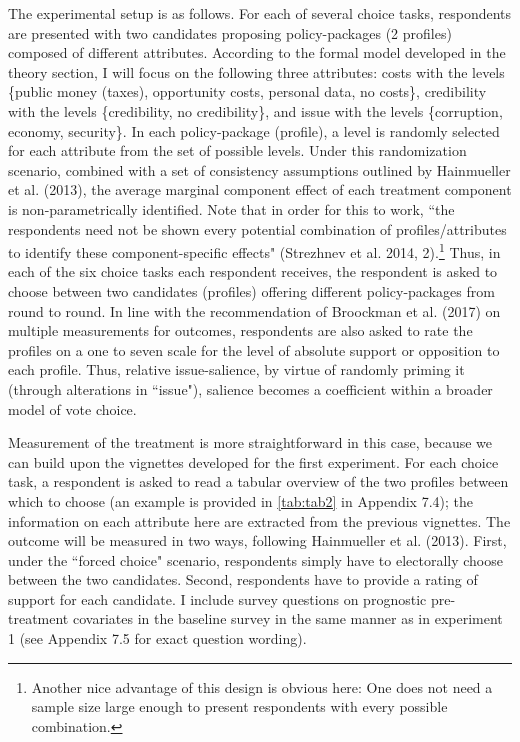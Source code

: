 \documentclass[11pt]{article}
\begin{document}
The experimental setup is as follows. For each of several choice tasks, respondents are presented with two candidates proposing policy-packages (2 profiles) composed of different attributes. According to the formal model developed in the theory section, I will focus on the following three attributes: costs with the levels \{public money (taxes), opportunity costs, personal data, no costs\}, credibility with the levels \{credibility, no credibility\}, and issue with the levels \{corruption, economy, security\}. In each policy-package (profile), a level is randomly selected for each attribute from the set of possible levels. Under this randomization scenario, combined with a set of consistency assumptions outlined by Hainmueller et al. (2013), the average marginal component effect of each treatment component is non-parametrically identified. Note that in order for this to work, “the respondents need not be shown every potential combination of profiles/attributes to identify these component-specific effects" (Strezhnev et al. 2014, 2).\footnote{Another nice advantage of this design is obvious here: One does not need a sample size large enough to present respondents with every possible combination.} Thus, in each of the six choice tasks each respondent receives, the respondent is asked to choose between two candidates (profiles) offering different policy-packages from round to round. In line with the recommendation of Broockman et al. (2017) on multiple measurements for outcomes, respondents are also asked to rate the profiles on a one to seven scale for the level of absolute support or opposition to each profile. Thus, relative issue-salience, by virtue of randomly priming it (through alterations in “issue"), salience becomes a coefficient within a broader model of vote choice.

Measurement of the treatment is more straightforward in this case, because we can build upon the vignettes developed for the first experiment. For each choice task, a respondent is asked to read a tabular overview of the two profiles between which to choose (an example is provided in \autoref{tab:tab2} in Appendix 7.4); the information on each attribute here are extracted from the previous vignettes. The outcome will be measured in two ways, following Hainmueller et al. (2013). First, under the “forced choice" scenario, respondents simply have to electorally choose between the two candidates. Second, respondents have to provide a rating of support for each candidate. I include survey questions on prognostic pre-treatment covariates in the baseline survey in the same manner as in experiment 1 (see Appendix 7.5 for exact question wording).
\end{document}
